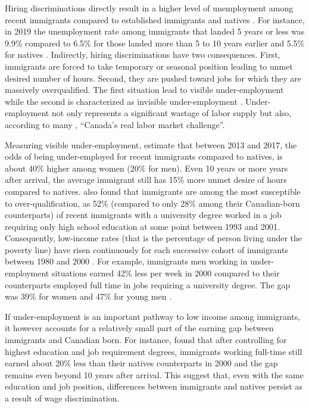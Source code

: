 \vspace{0.7em}\par
Hiring discriminations directly result in a higher level of unemployment among recent immigrants compared to established immigrants and natives \citep{Oreopoulos:2011jv}.
For instance, in 2019 the unemployment rate among immigrants that landed 5 years or less was 9.9\% compared to 6.5\% for those landed more than 5 to 10 years earlier and 5.5\% for natives \citep{statCan:002}.
Indirectly, hiring discriminations have two consequences.
First, immigrants are forced to take temporary or seasonal position leading to unmet desired number of hours.
Second, they are pushed toward jobs for which they are massively overqualified.
The first situation lead to visible under-employment while the second is characterized as invisible under-employment \citep{ilo:1982icls}.
Under-employment not only represents a significant wastage of labor supply \citep{Mitchell:2008wo} but also, according to many \citep{CanadianLabourCongress:2014wi,Li:2006uu}, ``Canada's real labor market challenge''.

\vspace{0.7em}\par
Measuring visible under-employment, \citet{gilbert:2020b} estimate that between 2013 and 2017, the odds of being under-employed for recent immigrants compared to natives, is about 40\% higher among women (20\% for men).
Even 10 years or more years after arrival, the average immigrant still has 15\% more unmet desire of hours compared to natives.
\citet{Li:2006uu} also found that immigrants are among the most susceptible to over-qualification, as 52\% (compared to only 28\% among their Canadian-born counterparts) of recent immigrants with a university degree worked in a job requiring only high school education at some point between 1993 and 2001.
Consequently, low-income rates (that is the percentage of person living under the poverty line) have risen continuously for each successive cohort of immigrants between 1980 and 2000  \citep{picot2003rise}.
For example, immigrants men working in under-employment situations earned 42\% less per week in 2000 compared to their counterparts employed full time in jobs requiring a university degree.
The gap was 39\% for women and 47\% for young men \citep{Morissette:wh}.

\vspace{0.7em}\par
If under-employment is an important pathway to low income among immigrants, it however accounts for a relatively small part of the earning gap between immigrants and Canadian born.
For instance, \citet{Morissette:wh} found that after controlling for highest education and job requirement degrees, immigrants working full-time still earned about 20\% less than their natives counterparts in 2000 and the gap remains even beyond 10 years after arrival.
This suggest that, even with the same education and job position, differences between immigrants and natives persist as a result of wage discrimination.

